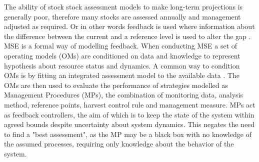 \documentclass[a4paper]{article}
\begin{document}


The ability of stock stock assessment models to make long-term projections is generally poor, therefore many stocks are assessed annually and management adjusted as required. Or in other words feedback is used where information about the difference between the current and a reference level is used to alter the gap \citep{ramaprasad1983definition}. MSE is a formal way of modelling feedback. When conducting MSE a set of operating models (OMs) are conditioned on data and knowledge to represent hypothesis about resource status and dynamics. A common way to condition OMs is by fitting an integrated assessment model to the available data \citep{sharma2020trfmo}. The OMs are then used to evaluate the performance of strategies modelled as Management Procedures (MPs), the combination of monitoring data, analysis method, reference points, harvest control rule and management measure. MPs act as feedback controllers, the aim of which is to keep the state of the system within agreed bounds despite uncertainty about system dynamics. This negates the need to find a "best assessment", as the MP may be a black box with no knowledge of the assumed processes, requiring only knowledge about the behavior of the system. 
\end{document}
